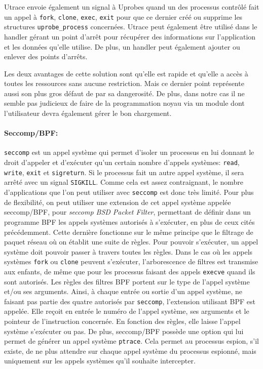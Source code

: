 Utrace envoie également un signal à Uprobes quand un des processus contrôlé fait
un appel à \texttt{fork}, \texttt{clone}, \texttt{exec}, \texttt{exit} pour que
ce dernier créé ou supprime les structures \texttt{uprobe\_process}
concernées. Utrace peut également être utilisé dans le handler gérant un point
d'arrêt pour récupérer des informations sur l'application et les données qu'elle
utilise. De plus, un handler peut également ajouter ou enlever des points
d'arrêts.

Les deux avantages de cette solution sont qu'elle est rapide et qu'elle a accès
à toutes les ressources sans aucune restriction. Mais ce dernier point
représente aussi son plus gros défaut de par sa dangerosité. De plus, dans notre
cas il ne semble pas judicieux de faire de la programmation noyau via un module
dont l'utilisateur devra également gérer le bon chargement.

\paragraph{Seccomp/BPF:}
\label{paragraph:seccomp/bpf}

\texttt{seccomp} \citep{seccompbpf} est un appel système qui permet d'isoler un processus
en lui donnant le droit d'appeler et d'exécuter qu'un certain nombre d'appels
systèmes: \texttt{read}, \texttt{write}, \texttt{exit} et \texttt{sigreturn}. Si
le processus fait un autre appel système, il sera arrêté avec un signal
\texttt{SIGKILL}. Comme cela est assez contraignant, le nombre d'applications
que l'on peut utiliser avec \texttt{seccomp} est donc très limité. Pour plus de
flexibilité, on peut utiliser une extension de cet appel système appelée
seccomp/BPF, pour \textit{seccomp BSD Packet Filter}, permettant de définir dans
un programme BPF \citep{BPF_mccanne1993bsd} les appels systèmes autorisés à
s'exécuter, en plus de ceux cités précédemment. Cette dernière fonctionne sur le
même principe que le filtrage de paquet réseau où on établit une suite de
règles. Pour pouvoir s'exécuter, un appel système doit pouvoir passer à travers
toutes les règles. Dans le cas où les appels systèmes \texttt{fork} ou
\texttt{clone} peuvent s'exécuter, l'arborescence de filtres est transmise aux
enfants, de même que pour les processus faisant des appels \texttt{execve}
quand ils sont autorisés. Les règles des filtres BPF portent sur le type de
l'appel système et/ou ses arguments. Ainsi, à chaque entrée ou sortie d'un appel
système, ne faisant pas partie des quatre autorisés par \texttt{seccomp}, l'extension
utilisant BPF est appelée. Elle reçoit en entrée le numéro de l'appel système,
ses arguments et le pointeur de l'instruction concernée. En fonction des règles,
elle laisse l'appel système s'exécuter ou pas.  De plus, seccomp/BPF possède une
option qui lui permet de générer un appel système \texttt{ptrace}. Cela permet
au processus espion, s'il existe, de ne plus attendre sur chaque appel système
du processus espionné, mais uniquement sur les appels systèmes qu'il souhaite
intercepter.

